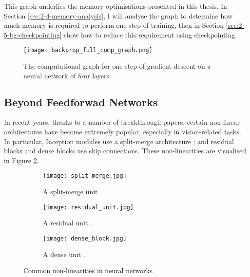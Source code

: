 This graph underlies the memory optimisations presented in this thesis.
In Section \ref{sec:2-4-memory-analysis}, I will analyse the graph to determine how much memory is required to perform one step of training,
then in Section \ref{sec:2-5-bg-checkpointing} show how to reduce this requirement using checkpointing.

\begin{figure}[t]
    \centering
    \texttt{[image: backprop\_full\_comp\_graph.png]}
    \caption{The computational graph for one step of gradient descent on a neural network of four layers.}
    \label{fig:2-nn-comp-graph}
\end{figure}

\subsection{Beyond Feedforwad Networks}
In recent years, thanks to a number of breakthrough papers, certain non-linear architectures have become extremely popular, especially in vision-related tasks.
In particular, Inception modules use a split-merge architecture \cite{Szegedy2015-inception, Szegedy2016-inception-res}; and residual blocks \cite{He2016-resnet, Xie2017-resnext, Szegedy2016-inception-res} and dense blocks \cite{Huang2017-densenet} use skip connections.
These non-linearities are visualised in Figure \ref{fig:2-non-linearities}.
\begin{figure}[hbtp]
    \centering
    \hspace{0.2cm}
    \begin{subfigure}[]{0.33\textwidth}
        \centering
        \texttt{[image: split-merge.jpg]}
        \caption{A split-merge unit \cite{Szegedy2015-inception, Szegedy2016-inception-res}.}
    \end{subfigure}%
    \hfill
    \begin{subfigure}[]{0.30\textwidth}
        \centering
        \texttt{[image: residual\_unit.jpg]}
        \caption{A residual unit \cite{He2016-resnet, Xie2017-resnext, Szegedy2016-inception-res}.}
    \end{subfigure}%
    \hfill
    \begin{subfigure}[]{0.33\textwidth}
        \centering
        \texttt{[image: dense\_block.jpg]}
        \caption{A dense unit \cite{Huang2017-densenet}.}
    \end{subfigure}%
    \hspace{0.2cm}
    \caption{Common non-linearities in neural networks.}
    \label{fig:2-non-linearities}
\end{figure}

